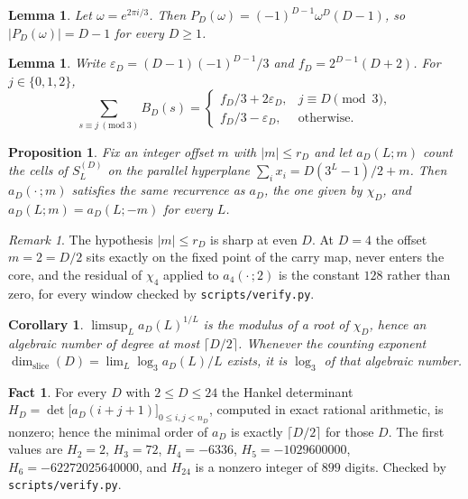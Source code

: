 \documentclass[11pt]{amsart}
\newtheorem{proposition}[theorem]{Proposition}
\newtheorem{lemma}[theorem]{Lemma}
\newtheorem{corollary}[theorem]{Corollary}
\theoremstyle{definition}
\newtheorem{fact}[theorem]{Fact}
\theoremstyle{remark}
\newtheorem{remark}[theorem]{Remark}
\begin{document}
\begin{lemma}
\label{lem:omega}
Let $\omega = e^{2\pi i/3}$. Then $P_D(\omega) = (-1)^{D-1}\omega^D (D-1)$, so $\lvert P_D(\omega) \rvert = D-1$ for every $D \ge 1$.
\end{lemma}

\begin{lemma}
\label{lem:classes}
Write $\varepsilon_D = (D-1)(-1)^{D-1}/3$ and $f_D = 2^{D-1}(D+2)$. For $j \in \{0,1,2\}$,
\[
\sum_{s \equiv j \ (\mathrm{mod}\ 3)} B_D(s) =
\begin{cases}
f_D/3 + 2\varepsilon_D, & j \equiv D \pmod 3, \\
f_D/3 - \varepsilon_D, & \text{otherwise}.
\end{cases}
\]
\end{lemma}

\begin{proposition}
\label{prop:offcentre}
Fix an integer offset $m$ with $\lvert m \rvert \le r_D$ and let $a_D(L;m)$ count the cells of $S_L^{(D)}$ on the parallel hyperplane $\sum_i x_i = D(3^L-1)/2 + m$. Then $a_D(\cdot\,;m)$ satisfies the same recurrence as $a_D$, the one given by $\chi_D$, and $a_D(L;m) = a_D(L;-m)$ for every $L$.
\end{proposition}

\begin{remark}
\label{rem:sharp}
The hypothesis $\lvert m \rvert \le r_D$ is sharp at even $D$. At $D = 4$ the offset $m = 2 = D/2$ sits exactly on the fixed point of the carry map, never enters the core, and the residual of $\chi_4$ applied to $a_4(\cdot\,;2)$ is the constant $128$ rather than zero, for every window checked by \texttt{scripts/verify.py}.
\end{remark}

\begin{corollary}
\label{cor:degree}
$\limsup_L a_D(L)^{1/L}$ is the modulus of a root of $\chi_D$, hence an algebraic number of degree at most $\lceil D/2 \rceil$. Whenever the counting exponent $\dim_{\mathrm{slice}}(D) = \lim_L \log_3 a_D(L) / L$ exists, it is $\log_3$ of that algebraic number.
\end{corollary}

\begin{fact}
\label{fact:exact}
For every $D$ with $2 \le D \le 24$ the Hankel determinant $H_D = \det\bigl[ a_D(i+j+1) \bigr]_{0 \le i,j < n_D}$, computed in exact rational arithmetic, is nonzero; hence the minimal order of $a_D$ is exactly $\lceil D/2 \rceil$ for those $D$. The first values are $H_2 = 2$, $H_3 = 72$, $H_4 = -6336$, $H_5 = -1029600000$, $H_6 = -62272025640000$, and $H_{24}$ is a nonzero integer of $899$ digits. Checked by \texttt{scripts/verify.py}.
\end{fact}
\end{document}
